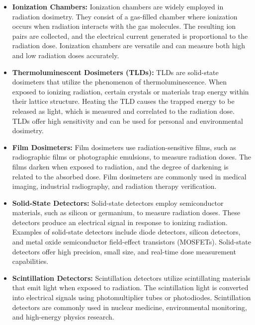 \documentclass[../introduction.tex]{subfiles}
\begin{document}
        \begin{itemize}
            \item \textbf{Ionization Chambers:} Ionization chambers are widely employed in radiation dosimetry. 
            They consist of a gas-filled chamber where ionization occurs when radiation interacts with the gas molecules. 
            The resulting ion pairs are collected, and the electrical current generated is proportional to the radiation 
            dose. Ionization chambers are versatile and can measure both high and low radiation doses accurately.

            \item \textbf{Thermoluminescent Dosimeters (TLDs): } TLDs are solid-state dosimeters that utilize the phenomenon of 
            thermoluminescence. When exposed to ionizing radiation, certain crystals or materials trap energy within 
            their lattice structure. Heating the TLD causes the trapped energy to be released as light, which is measured 
            and correlated to the radiation dose. TLDs offer high sensitivity and can be used for personal and environmental 
            dosimetry.

            \item \textbf{Film Dosimeters: } Film dosimeters use radiation-sensitive films, such as radiographic films or 
            photographic emulsions, to measure radiation doses. The films darken when exposed to radiation, and the degree 
            of darkening is related to the absorbed dose. Film dosimeters are commonly used in medical imaging, industrial 
            radiography, and radiation therapy verification.

            \item \textbf{Solid-State Detectors: } Solid-state detectors employ semiconductor materials, such as silicon 
            or germanium, to measure radiation doses. These detectors produce an electrical signal in response to ionizing 
            radiation. Examples of solid-state detectors include diode detectors, silicon detectors, and metal oxide 
            semiconductor field-effect transistors (MOSFETs). Solid-state detectors offer high precision, small size, and 
            real-time dose measurement capabilities.

            \item \textbf{Scintillation Detectors: } Scintillation detectors utilize scintillating materials that emit 
            light when exposed to radiation. The scintillation light is converted into electrical signals using 
            photomultiplier tubes or photodiodes. Scintillation detectors are commonly used in nuclear medicine, 
            environmental monitoring, and high-energy physics research.


\end{itemize}
\end{document}

